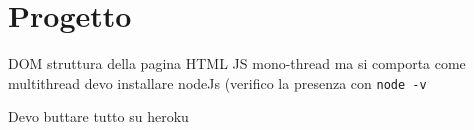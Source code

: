 \chapter{Progetto}

DOM struttura della pagina HTML 
JS mono-thread ma si comporta come multithread
devo installare nodeJs (verifico la presenza con \texttt{node -v}

Devo buttare tutto su heroku

